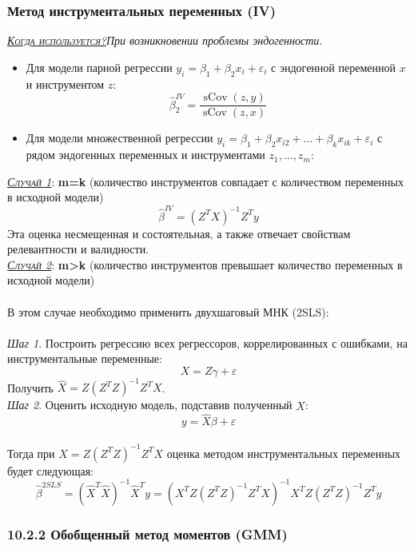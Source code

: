 \documentclass[a0,final]{a0poster}
\DeclareMathOperator{\sCov}{sCov}
\DeclareMathOperator{\E}{E}
\DeclareMathOperator*{\plim}{plim}
\begin{document}
\begin{multicols}{4}
\subsubsection*{\textbf{Метод инструментальных переменных (IV)}}
\underline{\textsc{\textit{Когда используется?}}}\textit{При возникновении проблемы эндогенности.}\\
\begin{itemize}
\item Для модели парной регрессии $y_i = \beta_1 + \beta_2x_i + \varepsilon_i$ с эндогенной переменной $x$ и инструментом $z$:
\[\hat{\beta}_2^{IV} = \frac{\sCov(z,y)}{\sCov(z,x)}\]

\item Для модели множественной регрессии  $y_i = \beta_1 + \beta_2x_{i2} + \ldots + \beta_kx_{ik} + \varepsilon_i$ с рядом эндогенных переменных и инструментами $z_1, \ldots,z_m$: \\
\end{itemize}
\underline{\textsc{\textit{Случай 1}}}: \textbf{m=k} (количество инструментов совпадает с количеством переменных в исходной модели)
\[\hat{\beta}^{IV} = ({Z^TX})^{-1}Z^Ty\]
Эта оценка несмещенная и состоятельная, а также отвечает свойствам релевантности и валидности. \\

\underline{\textsc{\textit{Случай 2}}}: \textbf{m>k} (количество инструментов превышает количество переменных в исходной модели) \\
\\
В этом случае необходимо применить двухшаговый МНК (2SLS): \\
\\
\textit{Шаг 1}. Построить регрессию всех регрессоров, коррелированных с ошибками, на инструментальные переменные:
\[X=Z\gamma + \varepsilon\]
Получить $\hat{X}=Z({Z^TZ})^{-1}Z^TX$.\\
\textit{Шаг 2}. Оценить исходную модель, подставив полученный $\hat{X}$: \[y=\hat{X}\beta+\varepsilon\] \\
Тогда при $\hat{X}=Z({Z^TZ})^{-1}Z^TX$ оценка методом инструментальных переменных будет следующая:
\[\hat{\beta}^{2SLS}=({\hat{X}^T\hat{X}})^{-1}\hat{X}^Ty = ({X^TZ({Z^TZ})^{-1}Z^TX})^{-1}{X^TZ({Z^TZ})^{-1}Z^Ty}\]

\subsubsection*{\textbf{10.2.2 Обобщенный метод моментов (GMM)}}


\end{multicols}
\end{document}
